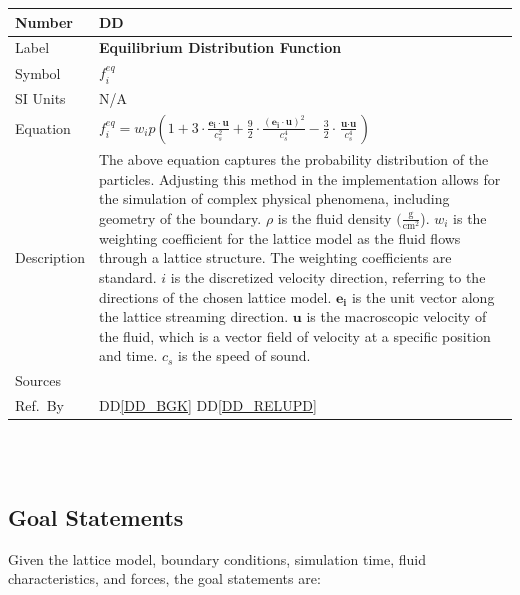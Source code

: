 \documentclass[12pt]{article}
\newcommand{\colAwidth}{0.13\textwidth}
\newcommand{\colBwidth}{0.82\textwidth}
\newcounter{defnum} %
\newcounter{datadefnum} %
\begin{document}
\noindent
\begin{minipage}{\textwidth}
	\renewcommand*{\arraystretch}{1.5}
	\begin{tabular}{| p{\colAwidth} | p{\colBwidth}|}
		\hline
		\rowcolor[gray]{0.9}
		Number& DD{datadefnum}\thedatadefnum 
		\label{DD_EDF}\\
		\hline
		Label& \bf Equilibrium Distribution Function\\
		\hline
		Symbol &$f_{i}^{eq}$\\
		\hline
		SI Units & N/A \\
		\hline
		Equation& $f_{i}^{eq} = w_{i}p(1 + 3 \cdot \frac{\textbf{e}_\textbf{i}\cdot\textbf{u}}{c_s^2}+\frac{9}{2} \cdot \frac{(\textbf{e}_\textbf{i}\cdot\textbf{u})^2}{c_s^4}-\frac{3}{2} \cdot \frac{\textbf{u}\cdot\textbf{u}}{c_s^4})$ \\
		\hline
		Description &
		The above equation captures the probability distribution of the
		particles. Adjusting this method in the implementation allows
		for the simulation of complex physical phenomena, including
		geometry of the boundary.
		$\rho$ is the fluid density $(\mathrm{\frac{g}{cm^2}}$). $w_{i}$ is the weighting
		coefficient for the lattice model as the fluid flows through a
		lattice structure. The weighting coefficients are standard. $i$
		is the discretized velocity direction, referring to the
		directions of the chosen lattice model. $\textbf{e}_\textbf{i}$ is the
		unit vector along the lattice streaming direction. $\textbf{u}$
		is the macroscopic velocity of the fluid, which is a vector
		field of velocity at a specific position and
		time. ${c_s}$ is the speed of sound.\\
		\hline
		Sources&  \citet{lbmbolton} \newline \citet{gibiansky} \newline \citet{mohamad2011lattice}\\
		\hline
		Ref.\ By & DD\ref{DD_BGK} DD\ref{DD_RELUPD}\\
		\hline
	\end{tabular}
\end{minipage}\\

~\newpage

\subsection{Goal Statements}
\label{goalstatements}
\noindent Given the lattice model, boundary conditions, simulation time, fluid characteristics, and forces, the goal statements are:
\end{document}
